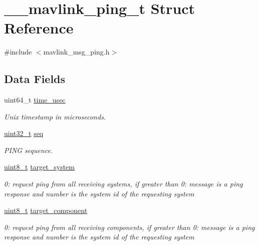 \hypertarget{struct____mavlink__ping__t}{\section{\-\_\-\-\_\-mavlink\-\_\-ping\-\_\-t Struct Reference}
\label{struct____mavlink__ping__t}
}


{\ttfamily \#include $<$mavlink\-\_\-msg\-\_\-ping.\-h$>$}

\subsection*{Data Fields}
\begin{DoxyCompactItemize}
\item 
uint64\-\_\-t \hyperlink{struct____mavlink__ping__t_a78bf2339554a175c2b5423fee61cf619}{time\-\_\-usec}
\begin{DoxyCompactList}\small\item\em Unix timestamp in microseconds. \end{DoxyCompactList}\item 
\hyperlink{stdint_8h_a435d1572bf3f880d55459d9805097f62}{uint32\-\_\-t} \hyperlink{struct____mavlink__ping__t_a753c4aa80232a414c05065646175bf46}{seq}
\begin{DoxyCompactList}\small\item\em P\-I\-N\-G sequence. \end{DoxyCompactList}\item 
\hyperlink{stdint_8h_aba7bc1797add20fe3efdf37ced1182c5}{uint8\-\_\-t} \hyperlink{struct____mavlink__ping__t_a349dd7a0a95dc0a9faef1a498172efe3}{target\-\_\-system}
\begin{DoxyCompactList}\small\item\em 0\-: request ping from all receiving systems, if greater than 0\-: message is a ping response and number is the system id of the requesting system \end{DoxyCompactList}\item 
\hyperlink{stdint_8h_aba7bc1797add20fe3efdf37ced1182c5}{uint8\-\_\-t} \hyperlink{struct____mavlink__ping__t_aea8c79743c35ac8e9d3d3362e2723f17}{target\-\_\-component}
\begin{DoxyCompactList}\small\item\em 0\-: request ping from all receiving components, if greater than 0\-: message is a ping response and number is the system id of the requesting system \end{DoxyCompactList}\end{DoxyCompactItemize}


